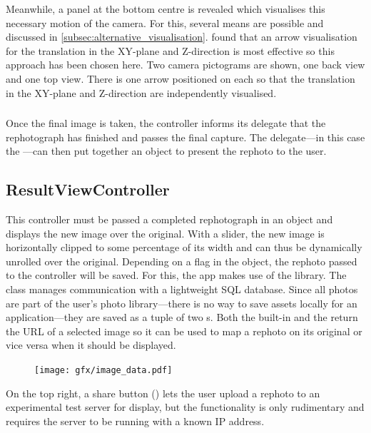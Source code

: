 Meanwhile, a panel at the bottom centre is revealed which visualises this
necessary motion of the camera. For this, several means are possible and
discussed in \autoref{subsec:alternative_visualisation}.
\citet{bae2010} found that an arrow visualisation for the translation in the
XY-plane and Z-direction is most effective so this approach has been chosen
here. Two camera pictograms are shown, one back view and one top view. There is
one arrow positioned on each so that the translation in the XY-plane and
Z-direction are independently visualised.


\subsubsection*{}

Once the final image is taken, the controller informs its delegate that the
rephotograph has finished and passes the final capture. The delegate---in this
case the ---can then put together an
 object to present the rephoto to the user.

\subsection{ResultViewController}


This controller must be passed a completed rephotograph in an 
object and displays the new image over the original.  With a slider, the new
image is horizontally clipped to some percentage of its width and can thus be
dynamically unrolled over the original. Depending on a flag in the
 object, the rephoto passed to the controller will be saved. For
this, the app makes use of the  library. The  class
manages communication with a lightweight SQL database. Since all photos are part
of the user's photo library---there is no way to save assets locally for an
application---they are saved as a tuple of two s. Both the built-in
 and the  return
the URL of a selected image so it can be used to map a rephoto on its original
or vice versa when it should be displayed.


\begin{figure}
   \texttt{[image: gfx/image\_data.pdf]}
\end{figure}
On the top right, a share button ()
lets the user upload a rephoto to an experimental test server for display, but the
functionality is only rudimentary and requires the server to be running with a known IP address.

